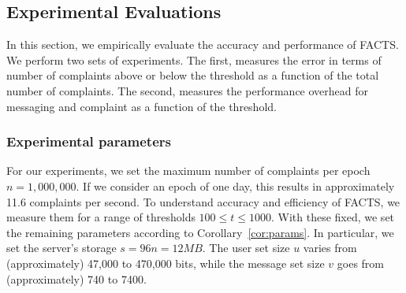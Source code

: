 \subsection{Experimental  Evaluations}\label{sec:experiments}
In this section, we empirically evaluate the accuracy and performance of FACTS.  We perform two sets of experiments.  The first, measures the error in terms of number of complaints above or below the threshold as a function of the total number of complaints.  The second, measures the performance overhead for messaging and complaint as a function of the threshold.  


\subsubsection{Experimental parameters}
For our experiments, we set the maximum number of complaints per epoch $n=1,000,000$.  If we consider an epoch of one day, this results in approximately 11.6 complaints per second. To understand accuracy and efficiency of FACTS, we measure them for a range of thresholds $100 \le t \le 1000$.  With these fixed, we set the remaining parameters according to Corollary~\ref{cor:params}.  In particular, we set the server's storage $s=96n=12MB$.  The user set size $u$ varies from (approximately) 47,000 to 470,000 bits, while the message set size $v$ goes from (approximately) 740 to 7400.  



